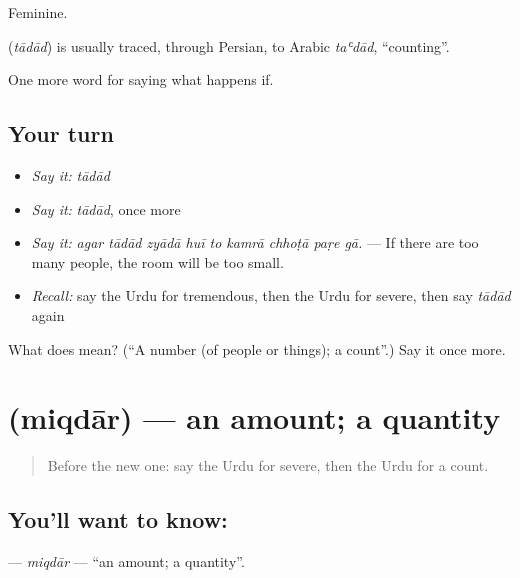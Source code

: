 Feminine.

\begin{cousinweb}
\textbf{} (\emph{tādād}) is usually traced, through Persian, to Arabic \emph{taʿdād}, \textquotedblleft{}counting\textquotedblright{}.
\end{cousinweb}

\begin{grammarlens}[title={What you've built}]
One more word for saying what happens if.
\end{grammarlens}

\subsection*{Your turn}
\begin{itemize}
\raggedright
  \item \emph{Say it:} \emph{tādād}
  \item \emph{Say it:} \emph{tādād}, once more
  \item \emph{Say it:} \emph{agar tādād zyādā huī to kamrā chhoṭā paṛe gā.} — If there are too many people, the room will be too small.
  \item \emph{Recall:} say the Urdu for tremendous, then the Urdu for severe, then say \emph{tādād} again
\end{itemize}

\begin{tcolorbox}[breakable,colback=teal!4,colframe=teal!35!black,title={Before you move on}]
What does  mean? (\textquotedblleft{}A number (of people or things); a count\textquotedblright{}.) Say it once more.
\end{tcolorbox}
\section[\texorpdfstring{\ur{مقدار} (miqdār)}{مقدار (miqdār)}]{ (miqdār) — an amount; a quantity}

\label{lesson:UR-C376-miqdar}



\begin{quote}
Before the new one: say the Urdu for severe, then the Urdu for a count.
\end{quote}

\subsection*{You'll want to know: }
\textbf{} — \emph{miqdār} — \textquotedblleft{}an amount; a quantity\textquotedblright{}.

